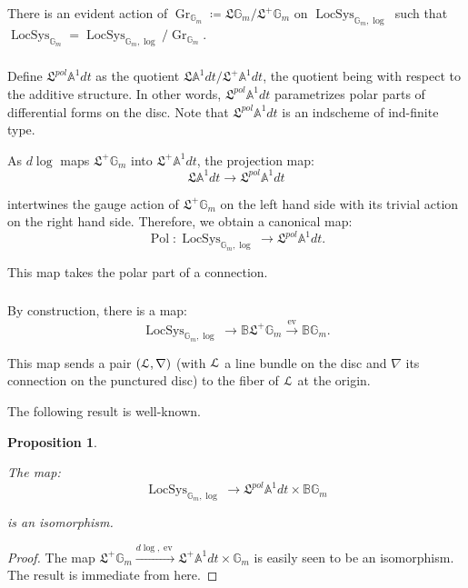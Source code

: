 \documentclass[reqno,11pt]{amsart}
\numberwithin{equation}{subsection}
\newtheorem{prop}[thm]{Proposition}
\theoremstyle{remark}
\newcommand{\xar}[1]{\xrightarrow{#1}}
\newcommand{\bA}{{\mathbb A}}
\newcommand{\bB}{{\mathbb B}}
\newcommand{\bG}{{\mathbb G}}
\newcommand{\sL}{{\EuScript L}}
\newcommand{\fL}{{\mathfrak L}}
\newcommand{\on}{\operatorname}
\newcommand{\ev}{\on{ev}}
\newcommand{\Gr}{\on{Gr}}
\newcommand{\LocSys}{\on{LocSys}}
\newcommand{\Pol}{\on{Pol}}
\begin{document}
There is an
evident action of $\Gr_{\bG_m} \coloneqq \fL \bG_m/\fL^+ \bG_m$ 
on $\LocSys_{\bG_m,\log}$ such that 
$\LocSys_{\bG_m} = \LocSys_{\bG_m,\log}/\Gr_{\bG_m}$.

\subsubsection{}

Define $\fL^{pol} \bA^1 dt$ as the quotient
$\fL \bA^1 dt / \fL^+\bA^1 dt$, the quotient being with respect
to the additive structure. In other words, $\fL^{pol} \bA^1 dt$
parametrizes polar parts of differential forms on the disc.
Note that $\fL^{pol} \bA^1 dt$ is an indscheme of ind-finite type.

As $d\log$ maps $\fL^+ \bG_m$ into $\fL^+ \bA^1 dt$, the
projection map:
%
\[
\fL \bA^1 dt \to \fL^{pol} \bA^1 dt
\]

\noindent intertwines the gauge action of $\fL^+ \bG_m$ on 
the left hand side with its trivial action on the right hand
side. Therefore, we obtain a canonical map:
%
\[
\Pol: \LocSys_{\bG_m,\log} \to \fL^{pol} \bA^1 dt.
\]

\noindent This map takes the polar part of a connection.

\subsubsection{}

By construction, there is a map:
%
\[
\LocSys_{\bG_m,\log} \to \bB \fL^+ \bG_m \xar{\ev} \bB \bG_m.
\]

\noindent This map sends a pair $(\sL,\nabla)$ (with $\sL$ a line
bundle on the disc and $\nabla$ its connection on the punctured
disc) to the fiber of $\sL$ at the origin.

The following result is well-known.

\begin{prop}\label{p:locsys-log}

The map:
%
\[
\LocSys_{\bG_m,\log} \to \fL^{pol} \bA^1 dt \times \bB \bG_m
\]

\noindent is an isomorphism.

\end{prop}

\begin{proof}

The map $\fL^+ \bG_m \xar{d\log,\ev} \fL^+ \bA^1 dt \times \bG_m$
is easily seen to be an isomorphism. The result is immediate
from here.

\end{proof}
\end{document}
